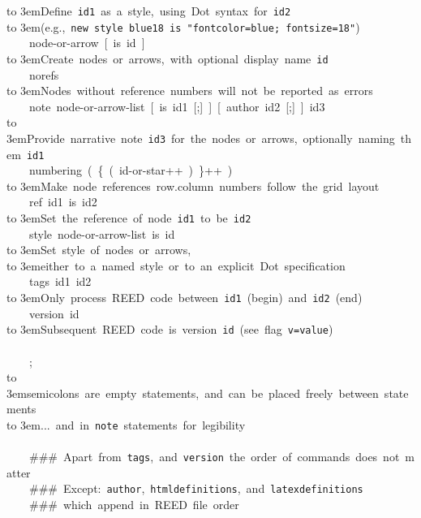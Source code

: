 {\hbox to 3em{}{\rm Define~\texttt{id1}~as~a~style,~using~Dot~syntax~for~\texttt{id2}}\\
\hbox to 3em{}{\rm (e.g.,~\texttt{new~style~blue18~is~"fontcolor=blue;~fontsize=18"})}\\
\hbox{}~~~~node-or-arrow~[~is~id~]\\
\hbox to 3em{}{\rm Create~nodes~or~arrows,~with~optional~display~name~\texttt{id}}\\
\hbox{}~~~~norefs\\
\hbox to 3em{}{\rm Nodes~without~reference~numbers~will~not~be~reported~as~errors}\\
\hbox{}~~~~note~node-or-arrow-list~[~is~id1~[;]~]~[~author~id2~[;]~]~id3\\
\hbox to 3em{}{\rm Provide~narrative~note~\texttt{id3}~for~the~nodes~or~arrows,~optionally~naming~them~\texttt{id1}}\\
\hbox{}~~~~numbering~(~\{~(~id-or-star++~)~\}++~)\\
\hbox to 3em{}{\rm Make~node~references~row.column~numbers~follow~the~grid~layout}\\
\hbox{}~~~~ref~id1~is~id2\\
\hbox to 3em{}{\rm Set~the~reference~of~node~\texttt{id1}~to~be~\texttt{id2}}\\
\hbox{}~~~~style~node-or-arrow-list~is~id\\
\hbox to 3em{}{\rm Set~style~of~nodes~or~arrows,}\\
\hbox to 3em{}{\rm either~to~a~named~style~or~to~an~explicit~Dot~specification}\\
\hbox{}~~~~tags~id1~id2\\
\hbox to 3em{}{\rm Only~process~REED~code~between~\texttt{id1}~(begin)~and~\texttt{id2}~(end)}\\
\hbox{}~~~~version~id\\
\hbox to 3em{}{\rm Subsequent~REED~code~is~version~\texttt{id}~(see~flag~\texttt{v=value})}\\
\hbox{}\\
\hbox{}~~~~;\\
\hbox to 3em{}{\rm semicolons~are~empty~statements,~and~can~be~placed~freely~between~statements}\\
\hbox to 3em{}{\rm ...~and~in~\texttt{note}~statements~for~legibility}\\
\hbox{}\\
\hbox{}~~~~{\rm \#\#\#~Apart~from~\texttt{tags},~and~\texttt{version}~the~order~of~commands~does~not~matter}\\
\hbox{}~~~~{\rm \#\#\#~Except:~\texttt{author},~\texttt{htmldefinitions},~and~\texttt{latexdefinitions}}\\
\hbox{}~~~~{\rm \#\#\#~which~append~in~REED~file~order}\\
\hbox{}}
